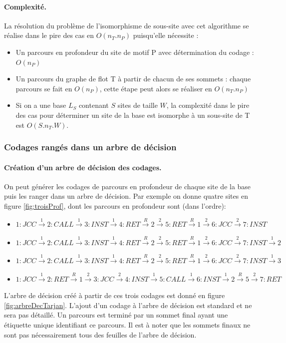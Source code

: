 \paragraph{Complexité.}
La résolution du problème de l'isomorphisme de sous-site avec cet algorithme se réalise dans le pire des cas en $O(n_T.n_P)$ puisqu'elle nécessite :
\begin{itemize}
 \item Un parcours en profondeur du site de motif P avec détermination du codage : $O(n_P)$
 \item Un parcours du graphe de flot T à partir de chacun de ses sommets : chaque parcours se fait en $O(n_P)$, cette étape peut alors se réaliser en $O(n_T.n_P)$
 \item Si on a une base $L_S$ contenant $S$ sites de taille $W$, la complexité dans le pire des cas pour déterminer un site de la base est isomorphe à un sous-site de T est $O(S.n_T.W)$.
\end{itemize}

\subsubsection{Codages rangés dans un arbre de décision}
\paragraph{Création d'un arbre de décision des codages.}
On peut générer les codages de parcours en profondeur de chaque site de la base puis les ranger dans un arbre de décision. Par exemple on donne quatre sites en figure \ref{fig:troisProf}, dont les parcours en profondeur sont (dans l'ordre):
\begin{itemize}
 \item $1: JCC\xrightarrow{1} 2: CALL \xrightarrow{1} 3: INST \xrightarrow{1} 4: RET \xrightarrow{R} 2 \xrightarrow{2} 5: RET \xrightarrow{R} 1 \xrightarrow{2} 6: JCC \xrightarrow{2} 7:INST$
 \item $1: JCC\xrightarrow{1} 2: CALL \xrightarrow{1} 3: INST \xrightarrow{1} 4: RET \xrightarrow{R} 2 \xrightarrow{2} 5: RET \xrightarrow{R} 1 \xrightarrow{2} 6: JCC \xrightarrow{2} 7:INST \xrightarrow{1} 2$
 \item $1: JCC\xrightarrow{1} 2: CALL \xrightarrow{1} 3: INST \xrightarrow{1} 4: RET \xrightarrow{R} 2 \xrightarrow{2} 5: RET \xrightarrow{R} 1 \xrightarrow{2} 6: JCC \xrightarrow{2} 7:INST \xrightarrow{1} 3$
 \item $1: JCC\xrightarrow{1} 2: RET \xrightarrow{R} 1 \xrightarrow{2} 3: JCC \xrightarrow{2} 4: INST \xrightarrow{1} 5: CALL \xrightarrow{1} 6: INST \xrightarrow{1} 2 \xrightarrow{R} 5 \xrightarrow{2} 7: RET$
\end{itemize}
L'arbre de décision créé à partir de ces trois codages est donné en figure \ref{fig:arbreDecTarjan}. L'ajout d'un codage à l'arbre de décision est standard et ne sera pas détaillé.
Un parcours est terminé par un sommet final ayant une étiquette unique identifiant ce parcours.
Il est à noter que les sommets finaux ne sont pas nécessairement tous des feuilles de l'arbre de décision.


